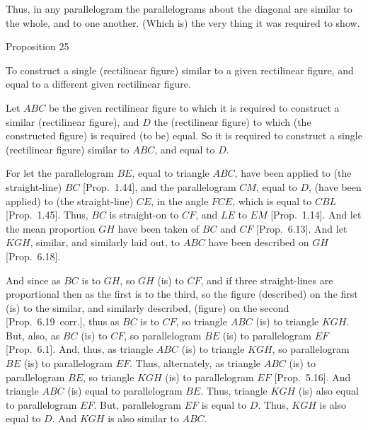 \epsfysize=2in
\centerline{}

Thus, in any parallelogram the parallelograms
about the diagonal are similar to the whole, and to one another.
(Which is) the very thing it was required to show.


\begin{center}
{\large Proposition 25}
\end{center}

To
 construct a single (rectilinear figure) similar to a given rectilinear figure, and equal to
a different given rectilinear figure.

\epsfysize=1.35in
\centerline{}

Let $ABC$ be the given rectilinear figure to which it is required to construct
a similar (rectilinear figure), and $D$ the (rectilinear figure) to which (the constructed figure) is required (to be) equal. So it is required to
construct a single (rectilinear figure) similar to $ABC$, and equal to $D$.

For  let the parallelogram $BE$, equal to triangle $ABC$, have been applied to
(the straight-line) $BC$  [Prop.~1.44], and the parallelogram $CM$, equal to $D$, (have been applied) to (the straight-line) $CE$,  in the angle $FCE$, which is equal to $CBL$  [Prop.~1.45]. Thus, $BC$ is
straight-on to $CF$, and $LE$ to $EM$ [Prop.~1.14]. And let the mean proportion $GH$ have
been taken of $BC$ and $CF$  [Prop.~6.13].
And let $KGH$, similar, and similarly laid out, to  $ABC$ have been described
on $GH$ [Prop.~6.18].

And since as $BC$ is to $GH$, so $GH$ (is) to $CF$, and if three straight-lines are
proportional then as the first is to the third, so the figure (described) on the first
(is) to the similar, and similarly described, (figure) on the second 
[Prop.~6.19~corr.],  thus as $BC$ is to
$CF$, so triangle $ABC$ (is) to triangle $KGH$. But, also, as $BC$ (is) to
$CF$, so parallelogram $BE$ (is) to parallelogram $EF$ [Prop.~6.1]. And, thus,  as triangle $ABC$ (is) to triangle $KGH$, so parallelogram $BE$ (is) to parallelogram $EF$. 
Thus, alternately, as triangle
$ABC$ (is) to parallelogram $BE$, so triangle $KGH$ (is) to
parallelogram $EF$ [Prop.~5.16]. 
And triangle $ABC$ (is) equal to parallelogram $BE$. Thus, triangle $KGH$
(is) also equal to parallelogram $EF$. But, parallelogram $EF$ is equal to $D$. 
Thus, $KGH$ is also equal to $D$. And $KGH$ is also similar to $ABC$.

